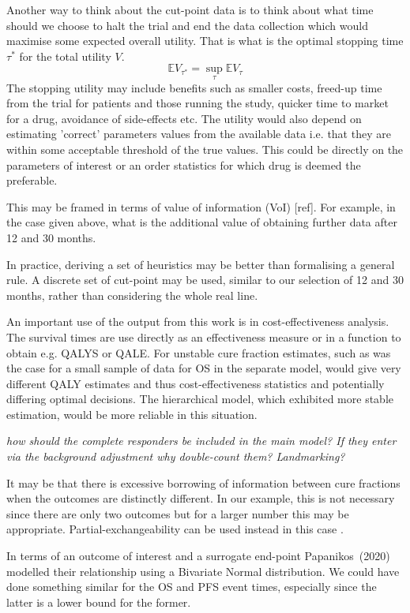 \documentclass[AMA,STIX1COL]{WileyNJD-v2}
\begin{document}
Another way to think about the cut-point data is to think about what time should we choose to halt the trial and end the data collection which would maximise some expected overall utility.
That is what is the optimal stopping time $\tau^*$ for the total utility $V$.
$$
\mathbb{E} V_{\tau^*} = \sup_{\tau} \mathbb{E} V_{\tau}
$$
The stopping utility may include benefits such as smaller costs, freed-up time from the trial for patients and those running the study, quicker time to market for a drug, avoidance of side-effects etc.
The utility would also depend on estimating 'correct' parameters values from the available data i.e. that they are within some acceptable threshold of the true values.
This could be directly on the parameters of interest or an order statistics for which drug is deemed the preferable.

This may be framed in terms of value of information (VoI) [ref].
For example, in the case given above, what is the additional value of obtaining further data after 12 and 30 months.

In practice, deriving a set of heuristics may be better than formalising a general rule.
A discrete set of cut-point may be used, similar to our selection of 12 and 30 months, rather than considering the whole real line.

An important use of the output from this work is in cost-effectiveness analysis.
The survival times are use directly as an effectiveness measure or in a function to obtain e.g. QALYS or QALE. For unstable cure fraction estimates, such as was the case for a small sample of data for OS in the separate model, would give very different QALY estimates and thus cost-effectiveness statistics and potentially differing optimal decisions.
The hierarchical model, which exhibited more stable estimation, would be more reliable in this situation.


{\it how should the complete responders be included in the main model? If they enter via the background adjustment why double-count them? Landmarking?}

It may be that there is excessive borrowing of information between cure fractions when the outcomes are distinctly different.
In our example, this is not necessary since there are only two outcomes but for a larger number this may be appropriate.
Partial-exchangeability can be used instead in this case \cite{Neuenschwander2016}.

In terms of an outcome of interest and a surrogate end-point Papanikos~(2020) \cite{Papanikos2020} modelled their relationship using a Bivariate Normal distribution.
We could have done something similar for the OS and PFS event times, especially since the latter is a lower bound for the former.
\end{document}
